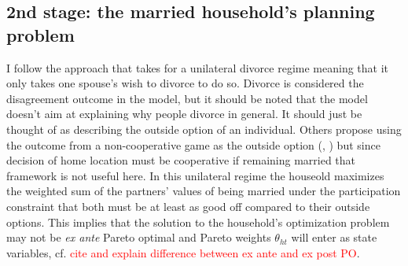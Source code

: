 \subsection{2nd stage: the married household's planning problem}
I follow the approach that \cite{Voena2015} takes for a unilateral divorce regime meaning that it only takes one spouse's wish to divorce to do so. Divorce is considered the disagreement outcome in the model, but it should be noted that the model doesn't aim at explaining why people divorce in general. It should just be thought of as describing the outside option of an individual. Others propose using the outcome from a non-cooperative game as the outside option (\cite{LundbergPollak1993}, \cite{DelbocaFlinn2012}) but since decision of home location must be cooperative if remaining married that framework is not useful here. In this unilateral regime the houseold maximizes the weighted sum of the partners' values of being married under the participation constraint that both must be at least as good off compared to their outside options. This implies that the solution to the household's optimization problem may not be \textit{ex ante} Pareto optimal and Pareto weights $\theta_{ht}$ will enter as state variables, cf. \textcolor{red}{cite and explain difference between ex ante and ex post PO}.

